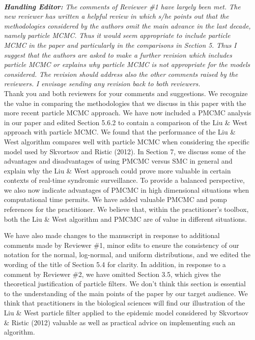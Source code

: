 \documentclass{article}
\begin{document}
 \\

\noindent \emph{{\bf Handling Editor:} The comments of Reviewer \#1 have largely been met.  The new reviewer has written a helpful review in which s/he points out that the methodologies considered by the authors omit the main advance in the last decade, namely particle MCMC.  Thus it would seem appropriate to include particle MCMC in the paper and particularly in the comparisons in Section 5.  Thus I suggest that the authors are asked to make a further revision which includes particle MCMC or explains why particle MCMC is not appropriate for the models considered.  The revision should address also the other comments raised by the reviewers.  I envisage sending any revision back to both reviewers.} \\

Thank you and both reviewers for your comments and suggestions. We recognize the value in comparing the methodologies that we discuss in this paper with the more recent particle MCMC approach. We have now included a PMCMC analysis in our paper and edited Section 5.6.2 to contain a comparison of the Liu \& West approach with particle MCMC. We found that the performance of the Liu \& West algorithm compares well with particle MCMC when considering the specific model used by Skvortsov and Ristic (2012). In Section 7, we discuss some of the advantages and disadvantages of using PMCMC versus SMC in general and explain why the Liu \& West approach could prove more valuable in certain contexts of real-time syndromic surveillance. To provide a balanced perspective, we also now indicate advantages of PMCMC in high dimensional situations when computational time permits. We have added valuable PMCMC and pomp references for the practitioner. We believe that, within the practitioner's toolbox, both the Liu \& West algorithm and PMCMC are of value in different situations.

We have also made changes to the manuscript in response to additional comments made by Reviewer \#1, minor edits to ensure the consistency of our notation for the normal, log-normal, and uniform distributions, and we edited the wording of the title of Section 5.4 for clarity. In addition, in response to a comment by Reviewer \#2, we have omitted Section 3.5, which gives the theoretical justification of particle filters. We don't think this section is essential to the understanding of the main points of the paper by our target audience. We think that practitioners in the biological sciences will find our illustration of the Liu \& West particle filter applied to the epidemic model considered by Skvortsov \& Ristic (2012) valuable as well as practical advice on implementing such an algorithm. \\
\end{document}
